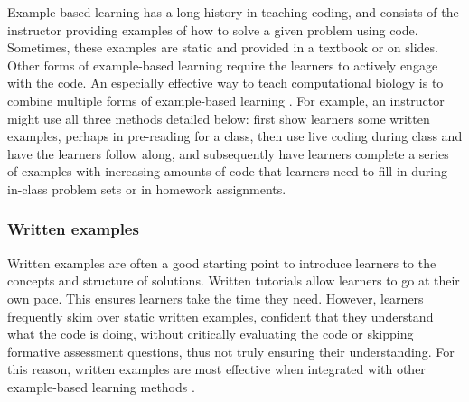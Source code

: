 Example-based learning has a long history in teaching coding, and consists of the instructor providing examples of how to solve a given problem using code.
Sometimes, these examples are static and provided in a textbook or on slides. 
Other forms of example-based learning require the learners to actively engage with the code. 
An especially effective way to teach computational biology is to combine multiple forms of example-based learning \citep{renkl_learning_2014}.
For example, an instructor might use all three methods detailed below:
first show learners some written examples, perhaps in pre-reading for a class, then use live coding during class and have the learners follow along, and subsequently have learners complete a series of examples with increasing amounts of code that learners need to fill in during in-class problem sets or in homework assignments.



\subsubsection{Written examples}

Written examples are often a good starting point to introduce learners to the concepts and structure of solutions.
Written tutorials allow learners to go at their own pace.
This ensures learners take the time they need.
However, learners frequently skim over static written examples, confident that they understand what the code is doing, without critically evaluating the code or skipping formative assessment questions, thus not truly ensuring their understanding.
For this reason, written examples are most effective when integrated with other example-based learning methods \citep{renkl_learning_2014}.


